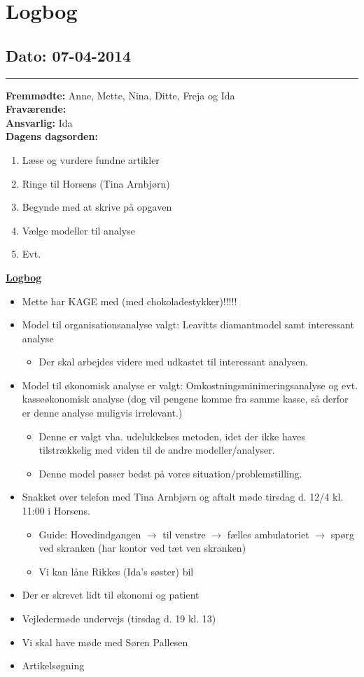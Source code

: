 \chapter{Logbog}
\section{Dato: 07-04-2014}
\hrule
\textbf{Fremmødte: } Anne, Mette, Nina, Ditte, Freja og Ida \\
\textbf{Fraværende: } \\
\textbf{Ansvarlig:} Ida  \\
\textbf{Dagens dagsorden: }
\begin{enumerate}
	\item Læse og vurdere fundne artikler
	\item Ringe til Horsens (Tina Arnbjørn)
	\item Begynde med at skrive på opgaven
	\item Vælge modeller til analyse
	\item Evt. 
\end{enumerate}

\underline{\textbf{Logbog}}
\begin{itemize}
\item Mette har KAGE med (med chokoladestykker)!!!!! 
\item Model til organisationsanalyse valgt: Leavitts diamantmodel samt interessant analyse
\begin{itemize}
\item Der skal arbejdes videre med udkastet til interessant analysen.
\end{itemize}
\item Model til økonomisk analyse er valgt: Omkostningsminimeringsanalyse og evt. kasseøkonomisk analyse (dog vil pengene komme fra samme kasse, så derfor er denne analyse muligvis irrelevant.)
\begin{itemize}
\item Denne er valgt vha. udelukkelses metoden, idet der ikke haves tilstrækkelig med viden til de andre modeller/analyser.
\item Denne model passer bedst på vores situation/problemstilling.
\end{itemize}
\item Snakket over telefon med Tina Arnbjørn og aftalt møde tirsdag d. 12/4 kl. 11:00 i Horsens.
\begin{itemize}
\item Guide: Hovedindgangen $\rightarrow$ til venstre $\rightarrow$ fælles ambulatoriet $\rightarrow$ spørg ved skranken (har kontor ved tæt ven skranken)
\item Vi kan låne Rikkes (Ida's søster) bil
\end{itemize}
\item Der er skrevet lidt til økonomi og patient
\item Vejledermøde undervejs (tirsdag d. 19 kl. 13)
\item Vi skal have møde med Søren Pallesen
\item Artikelsøgning
\end{itemize}
\newpage